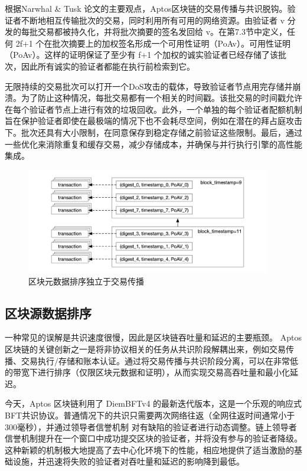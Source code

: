 \documentclass{article}
\begin{document}
根据Narwhal & Tusk \cite{narwhal_tusk}论文的主要观点，Aptos区块链的交易传播与共识脱钩。验证者不断地相互传输批次的交易，同时利用所有可用的网络资源。由验证者 v 分发的每批交易都被持久化，并将批次摘要的签名发回给 v。在第7.3节中定义，任何 2f+1 个在批次摘要上的加权签名形成一个可用性证明（PoAv）。可用性证明（PoAv）。这样的证明保证了至少有 f+1 个加权的诚实验证者已经存储了该批次，因此所有诚实的验证者都能在执行前检索到它。

无限持续的交易批次可以打开一个DoS攻击的载体，导致验证者节点用完存储并崩溃。为了防止这种情况，每批交易都有一个相关的时间戳。该批交易的时间戳允许在每个验证者节点上进行有效的垃圾回收。此外，一个单独的每个验证者配额机制旨在保护验证者即使在最极端的情况下也不会耗尽空间，例如在潜在的拜占庭攻击下。批次还具有大小限制，在同意保存到稳定存储之前验证这些限制。最后，通过一些优化来消除重复和缓存交易，减少存储成本，并确保与并行执行引擎的高性能集成。

\begin{figure}
\centering
\includegraphics[width=0.95\textwidth]{ordering.png}
\caption{\label{fig:block}区块元数据排序独立于交易传播}
\end{figure}

\subsection{区块源数据排序}
\label{subsec:block_metadata_ordering}

一种常见的误解是共识速度很慢，因此是区块链吞吐量和延迟的主要瓶颈。 Aptos 区块链的关键创新之一是将非协议相关的任务从共识阶段解耦出来，例如交易传播、交易执行/存储和账本认证。通过将交易传播与共识阶段分离，可以在非常低的带宽下进行排序（仅限区块元数据和证明），从而实现交易高吞吐量和最小化延迟。

今天，Aptos 区块链利用了 DiemBFTv4 \cite{diembft_v4} 的最新迭代版本，这是一个乐观的响应式BFT共识协议。普通情况下的共识只需要两次网络往返（全网往返时间通常小于300毫秒），并通过领导者信誉机制 \cite{be_aware} 对有缺陷的验证者进行动态调整。链上领导者信誉机制提升在一个窗口中成功提交区块的验证者，并将没有参与的验证者降级。这种新颖的机制极大地提高了去中心化环境下的性能，相应地提供了适当激励的基础设施，并迅速将失败的验证者对吞吐量和延迟的影响降到最低。
\end{document}
